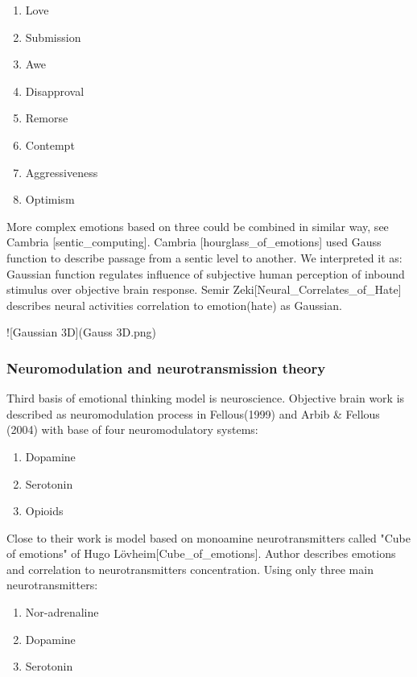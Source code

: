 \begin{enumerate}
\item  Love
\item  Submission
\item  Awe
\item  Disapproval
\item  Remorse
\item  Contempt
\item  Aggressiveness
\item  Optimism
\end{enumerate}

More complex emotions based on three could be combined in similar way, see Cambria [sentic_computing].
Cambria [hourglass_of_emotions] used Gauss function to describe passage from a sentic level to another. We interpreted it as: Gaussian function regulates influence of subjective human perception of inbound stimulus over objective brain response. Semir Zeki[Neural_Correlates_of_Hate] describes neural activities correlation to emotion(hate) as Gaussian.

![Gaussian 3D](Gauss 3D.png)


\subsubsection{Neuromodulation and neurotransmission theory}

Third basis of emotional thinking model is neuroscience. Objective brain work is described as neuromodulation process in Fellous(1999) and Arbib & Fellous (2004) with base of four neuromodulatory systems:

\begin{enumerate}
\item  Dopamine
\item  Serotonin
\item  Opioids
\end{enumerate}

Close to their work is model based on monoamine neurotransmitters called "Cube of emotions" of Hugo Lövheim[Cube_of_emotions].
Author describes emotions and correlation to neurotransmitters concentration. Using only three main neurotransmitters:

\begin{enumerate}
\item  Nor-adrenaline
\item  Dopamine
\item  Serotonin
\end{enumerate}

